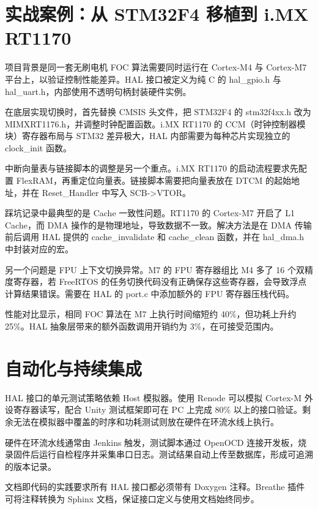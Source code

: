 \chapter{实战案例：从 STM32F4 移植到 i.MX RT1170}
项目背景是同一套无刷电机 FOC 算法需要同时运行在 Cortex-M4 与 Cortex-M7 平台上，以验证控制性能差异。HAL 接口被定义为纯 C 的 hal\_{}gpio.h 与 hal\_{}uart.h，内部使用不透明句柄封装硬件实例。\par
在底层实现切换时，首先替换 CMSIS 头文件，把 STM32F4 的 stm32f4xx.h 改为 MIMXRT1176.h，并调整时钟配置函数。i.MX RT1170 的 CCM（时钟控制器模块）寄存器布局与 STM32 差异极大，HAL 内部需要为每种芯片实现独立的 clock\_{}init 函数。\par
中断向量表与链接脚本的调整是另一个重点。i.MX RT1170 的启动流程要求先配置 FlexRAM，再重定位向量表。链接脚本需要把向量表放在 DTCM 的起始地址，并在 Reset\_{}Handler 中写入 SCB->VTOR。\par
踩坑记录中最典型的是 Cache 一致性问题。RT1170 的 Cortex-M7 开启了 L1 Cache，而 DMA 操作的是物理地址，导致数据不一致。解决方法是在 DMA 传输前后调用 HAL 提供的 cache\_{}invalidate 和 cache\_{}clean 函数，并在 hal\_{}dma.h 中封装对应的宏。\par
另一个问题是 FPU 上下文切换异常。M7 的 FPU 寄存器组比 M4 多了 16 个双精度寄存器，若 FreeRTOS 的任务切换代码没有正确保存这些寄存器，会导致浮点计算结果错误。需要在 HAL 的 port.c 中添加额外的 FPU 寄存器压栈代码。\par
性能对比显示，相同 FOC 算法在 M7 上执行时间缩短约 40\%{}，但功耗上升约 25\%{}。HAL 抽象层带来的额外函数调用开销约为 3\%{}，在可接受范围内。\par
\chapter{自动化与持续集成}
HAL 接口的单元测试策略依赖 Host 模拟器。使用 Renode 可以模拟 Cortex-M 外设寄存器读写，配合 Unity 测试框架即可在 PC 上完成 80\%{} 以上的接口验证。剩余无法在模拟器中覆盖的时序和功耗测试则放在硬件在环流水线上执行。\par
硬件在环流水线通常由 Jenkins 触发，测试脚本通过 OpenOCD 连接开发板，烧录固件后运行自检程序并采集串口日志。测试结果自动上传至数据库，形成可追溯的版本记录。\par
文档即代码的实践要求所有 HAL 接口都必须带有 Doxygen 注释。Breathe 插件可将注释转换为 Sphinx 文档，保证接口定义与使用文档始终同步。\par
